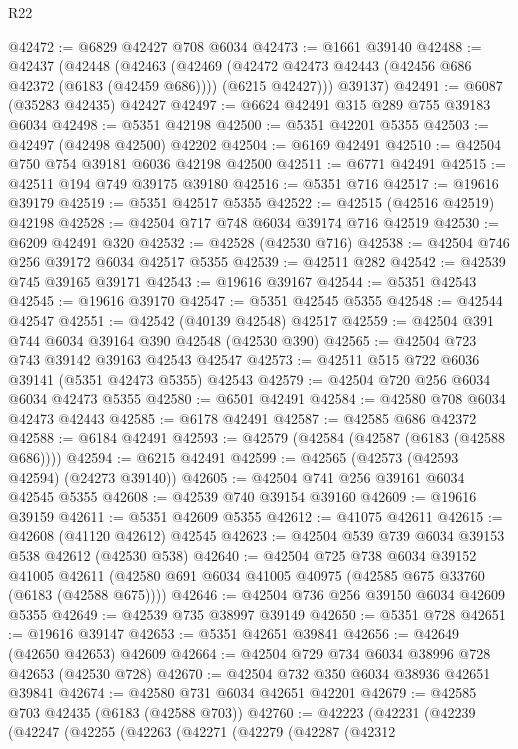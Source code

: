 \begin{lexlean}{R22}
\begin{coremodule}
@42472 := @6829 @42427 @708 @6034
@42473 := @1661 @39140
@42488 := @42437
    (@42448
      (@42463
        (@42469 (@42472 @42473 @42443 (@42456 @686 @42372 (@6183 (@42459 @686)))) (@6215 @42427)))
      @39137)
@42491 := @6087 (@35283 @42435) @42427
@42497 := @6624 @42491 @315 @289 @755 @39183 @6034
@42498 := @5351 @42198
@42500 := @5351 @42201 @5355
@42503 := @42497 (@42498 @42500) @42202
@42504 := @6169 @42491
@42510 := @42504 @750 @754 @39181 @6036 @42198 @42500
@42511 := @6771 @42491
@42515 := @42511 @194 @749 @39175 @39180
@42516 := @5351 @716
@42517 := @19616 @39179
@42519 := @5351 @42517 @5355
@42522 := @42515 (@42516 @42519) @42198
@42528 := @42504 @717 @748 @6034 @39174 @716 @42519
@42530 := @6209 @42491 @320
@42532 := @42528 (@42530 @716)
@42538 := @42504 @746 @256 @39172 @6034 @42517 @5355
@42539 := @42511 @282
@42542 := @42539 @745 @39165 @39171
@42543 := @19616 @39167
@42544 := @5351 @42543
@42545 := @19616 @39170
@42547 := @5351 @42545 @5355
@42548 := @42544 @42547
@42551 := @42542 (@40139 @42548) @42517
@42559 := @42504 @391 @744 @6034 @39164 @390 @42548 (@42530 @390)
@42565 := @42504 @723 @743 @39142 @39163 @42543 @42547
@42573 := @42511 @515 @722 @6036 @39141 (@5351 @42473 @5355) @42543
@42579 := @42504 @720 @256 @6034 @6034 @42473 @5355
@42580 := @6501 @42491
@42584 := @42580 @708 @6034 @42473 @42443
@42585 := @6178 @42491
@42587 := @42585 @686 @42372
@42588 := @6184 @42491
@42593 := @42579 (@42584 (@42587 (@6183 (@42588 @686))))
@42594 := @6215 @42491
@42599 := @42565 (@42573 (@42593 @42594) (@24273 @39140))
@42605 := @42504 @741 @256 @39161 @6034 @42545 @5355
@42608 := @42539 @740 @39154 @39160
@42609 := @19616 @39159
@42611 := @5351 @42609 @5355
@42612 := @41075 @42611
@42615 := @42608 (@41120 @42612) @42545
@42623 := @42504 @539 @739 @6034 @39153 @538 @42612 (@42530 @538)
@42640 := @42504
    @725
    @738
    @6034
    @39152
    @41005
    @42611
    (@42580 @691 @6034 @41005 @40975 (@42585 @675 @33760 (@6183 (@42588 @675))))
@42646 := @42504 @736 @256 @39150 @6034 @42609 @5355
@42649 := @42539 @735 @38997 @39149
@42650 := @5351 @728
@42651 := @19616 @39147
@42653 := @5351 @42651 @39841
@42656 := @42649 (@42650 @42653) @42609
@42664 := @42504 @729 @734 @6034 @38996 @728 @42653 (@42530 @728)
@42670 := @42504 @732 @350 @6034 @38936 @42651 @39841
@42674 := @42580 @731 @6034 @42651 @42201
@42679 := @42585 @703 @42435 (@6183 (@42588 @703))
@42760 := @42223
    (@42231
      (@42239
        (@42247
          (@42255
            (@42263
              (@42271
                (@42279
                  (@42287
                    (@42312

\end{coremodule}
\end{lexlean}
